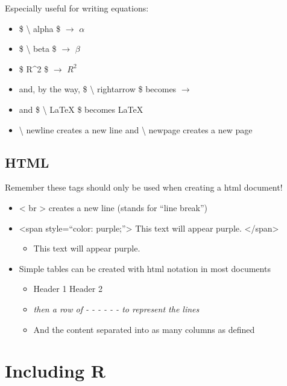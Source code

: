 \documentclass[
]{book}
\providecommand{\tightlist}{%
  \setlength{\itemsep}{0pt}\setlength{\parskip}{0pt}}
\begin{document}
Especially useful for writing equations:

\begin{itemize}
\tightlist
\item
  \$ \textbackslash{} alpha \$ \(\rightarrow\) \(\alpha\)
\item
  \$ \textbackslash{} beta \$ \(\rightarrow\) \(\beta\)
\item
  \$ R\^{}2 \$ \(\rightarrow\) \(R^2\)
\item
  and, by the way, \$ \textbackslash{} rightarrow \$ becomes \(\rightarrow\)
\item
  and \$ \textbackslash{} LaTeX \$ becomes \LaTeX
\item
  \textbackslash{} newline creates a new line and \textbackslash{} newpage creates a new page
\end{itemize}

\subsection{HTML}\label{html}

Remember these tags should only be used when creating a html document!

\begin{itemize}
\tightlist
\item
  \textless{} br \textgreater{} creates a new line (stands for ``line break'')
\item
  \textless span style=``color: purple;''\textgreater{} This text will appear purple. \textless/span\textgreater{}

  \begin{itemize}
  \tightlist
  \item
    { This text will appear purple. }
  \end{itemize}
\item
  Simple tables can be created with html notation in most documents

  \begin{itemize}
  \tightlist
  \item
    Header 1 \textbar{} Header 2
  \item
    \emph{then a row of - - - \textbar{} - - - to represent the lines}
  \item
    And the content separated \textbar{} into as many columns as defined
  \end{itemize}
\end{itemize}

\section{Including R}\label{including-r}
\end{document}
